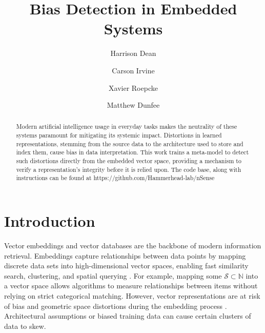 \documentclass[sigconf]{acmart}
\begin{document}
\title{Bias Detection in Embedded Systems}

\author{Harrison Dean}

\author{Carson Irvine}

\author{Xavier Roepcke}

\author{Matthew Dunfee}

\begin{abstract}
Modern artificial intelligence usage in everyday tasks makes the neutrality of these systems paramount for mitigating its systemic impact. Distortions in learned representations, stemming from the source data to the architecture used to store and index them, cause bias in data interpretation. This work trains a meta-model to detect such distortions directly from the embedded vector space, providing a mechanism to verify a representation's integrity before it is relied upon. The code base, along with instructions can be found at https://github.com/Hammerhead-lab/nSense 
\end{abstract}


\maketitle

\section{Introduction}
Vector embeddings and vector databases are the backbone of modern information retrieval. Embeddings capture relationships between data points by mapping discrete data sets into high-dimensional vector spaces, enabling fast similarity search, clustering, and spatial querying \cite{jegou2010product}. For example, mapping some $\mathcal{S} \subset \mathbb{N}$ into a vector space allows algorithms to measure relationships between items without relying on strict categorical matching. However, vector representations are at risk of bias and geometric space distortions during the embedding process \cite{NIPS2016_a486cd07}. Architectural assumptions or biased training data can cause certain clusters of data to skew. 
\end{document}
